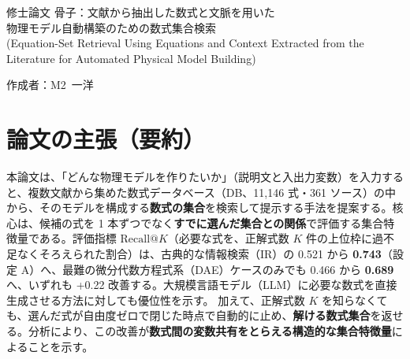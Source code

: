 \documentclass[11pt,a4paper]{ltjsarticle}
\makeatletter
\newcommand{\rk}{\textrm{Recall@}K}
\makeatother
\begin{document}
\begin{center}
{\sffamily\large 修士論文 骨子：文献から抽出した数式と文脈を用いた\\
物理モデル自動構築のための数式集合検索}\\
\vspace{0.2em}
{\small (Equation-Set Retrieval Using Equations and Context Extracted from the Literature for Automated Physical Model Building)}
\end{center}
\vspace{0.1em}
\hfill 作成者：M2\ 一洋
\vspace{0.4em}


\section*{論文の主張（要約）}
本論文は、「どんな物理モデルを作りたいか」（説明文と入出力変数）を入力すると、複数文献から集めた数式データベース（DB、11{,}146 式・361 ソース）の中から、そのモデルを構成する\textbf{数式の集合}を検索して提示する手法を提案する。核心は、候補の式を 1 本ずつでなく\textbf{すでに選んだ集合との関係}で評価する集合特徴量である。評価指標 $\rk$（必要な式を、正解式数 $K$ 件の上位枠に過不足なくそろえられた割合）は、古典的な情報検索（IR）の 0.521 から \textbf{0.743}（設定 A）へ、最難の微分代数方程式系（DAE）ケースのみでも 0.466 から \textbf{0.689} へ、いずれも +0.22 改善する。大規模言語モデル（LLM）に必要な数式を直接生成させる方法に対しても優位性を示す。
加えて、正解式数 $K$ を知らなくても、選んだ式が自由度ゼロで閉じた時点で自動的に止め、\textbf{解ける数式集合}を返せる。分析により、この改善が\textbf{数式間の変数共有をとらえる構造的な集合特徴量}によることを示す。

\end{document}
